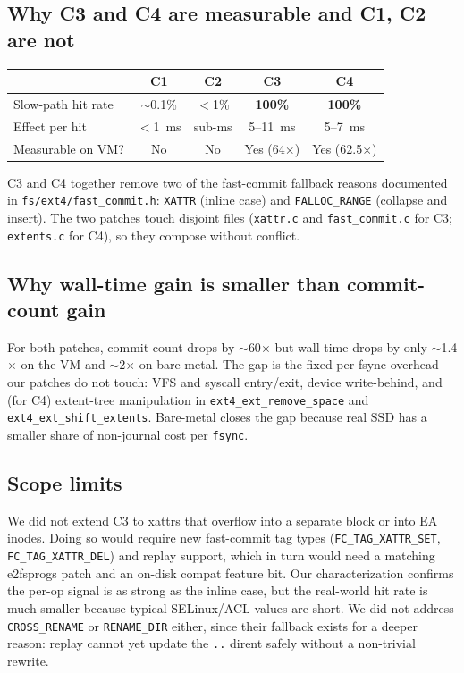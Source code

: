 \documentclass[11pt,a4paper]{article}
\begin{document}
\subsection{Why C3 and C4 are measurable and C1, C2 are not}

\begin{center}
\begin{tabular}{lcccc}
\toprule
 & C1 & C2 & \textbf{C3} & \textbf{C4} \\
\midrule
Slow-path hit rate & $\sim$0.1\% & $<$1\% & \textbf{100\%} & \textbf{100\%} \\
Effect per hit     & $<$1~ms     & sub-ms & 5--11~ms        & 5--7~ms \\
Measurable on VM?  & No          & No     & Yes (64$\times$) & Yes (62.5$\times$) \\
\bottomrule
\end{tabular}
\end{center}

C3 and C4 together remove two of the fast-commit fallback reasons
documented in \texttt{fs/ext4/fast\_commit.h}: \texttt{XATTR}
(inline case) and \texttt{FALLOC\_RANGE} (collapse and insert).
The two patches touch disjoint files (\texttt{xattr.c} and
\texttt{fast\_commit.c} for C3; \texttt{extents.c} for C4), so
they compose without conflict.

\subsection{Why wall-time gain is smaller than commit-count gain}

For both patches, commit-count drops by $\sim$60$\times$ but
wall-time drops by only $\sim$1.4$\times$ on the VM and
$\sim$2$\times$ on bare-metal. The gap is the fixed per-fsync
overhead our patches do not touch: VFS and syscall entry/exit,
device write-behind, and (for C4) extent-tree manipulation in
\texttt{ext4\_ext\_remove\_space} and
\texttt{ext4\_ext\_shift\_extents}. Bare-metal closes the gap
because real SSD has a smaller share of non-journal cost per
\texttt{fsync}.

\subsection{Scope limits}

We did not extend C3 to xattrs that overflow into a separate block
or into EA inodes. Doing so would require new fast-commit tag
types (\texttt{FC\_TAG\_XATTR\_SET}, \texttt{FC\_TAG\_XATTR\_DEL})
and replay support, which in turn would need a matching
e2fsprogs patch and an on-disk compat feature bit. Our
characterization confirms the per-op signal is as strong as the
inline case, but the real-world hit rate is much smaller because
typical SELinux/ACL values are short. We did not address
\texttt{CROSS\_RENAME} or \texttt{RENAME\_DIR} either, since
their fallback exists for a deeper reason: replay cannot yet
update the \texttt{..} dirent safely without a non-trivial
rewrite.
\end{document}
